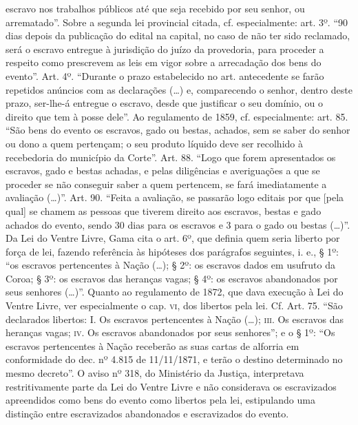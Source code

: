 {{  escravo nos trabalhos públicos até que seja recebido por seu senhor,
  ou arrematado''. Sobre a segunda lei provincial citada, cf.
  especialmente: art. 3º. ``90 dias depois da publicação do edital na
  capital, no caso de não ter sido reclamado, será o escravo entregue à
  jurisdição do juízo da provedoria, para proceder a respeito como
  prescrevem as leis em vigor sobre a arrecadação dos bens do evento''.
  Art. 4º. ``Durante o prazo estabelecido no art. antecedente se farão
  repetidos anúncios com as declarações (\ldots{}) e, comparecendo o senhor,
  dentro deste prazo, ser-lhe-á entregue o escravo, desde que justificar
  o seu domínio, ou o direito que tem à posse dele''. Ao regulamento de
  1859, cf. especialmente: art. 85. ``São bens do evento os escravos,
  gado ou bestas, achados, sem se saber do senhor ou dono a quem
  pertençam; o seu produto líquido deve ser recolhido à recebedoria do
  município da Corte''. Art. 88. ``Logo que forem apresentados os escravos,
  gado e bestas achadas, e pelas diligências e averiguações a que se
  proceder se não conseguir saber a quem pertencem, se fará
  imediatamente a avaliação (\ldots{})''. Art. 90. ``Feita a avaliação, se
  passarão logo editais por que {[}pela qual{]} se chamem as pessoas que
  tiverem direito aos escravos, bestas e gado achados do evento, sendo
  30 dias para os escravos e 3 para o gado ou bestas (\ldots{})''. Da Lei do
  Ventre Livre, Gama cita o art. 6º, que definia quem seria liberto por
  força de lei, fazendo referência às hipóteses dos parágrafos
  seguintes, i. e., § 1º: ``os escravos pertencentes à Nação (\ldots{}); §
  2º: os escravos dados em usufruto da Coroa; § 3º: os escravos das
  heranças vagas; § 4º: os escravos abandonados por seus senhores
  (\ldots{})''. Quanto ao regulamento de 1872, que dava execução à Lei do
  Ventre Livre, ver especialmente o cap. \textsc{vi}, dos libertos pela lei. Cf.
  Art. 75. ``São declarados libertos: I. Os escravos pertencentes à Nação
  (\ldots{}); \textsc{iii}. Os escravos das heranças vagas; \textsc{iv}. Os escravos
  abandonados por seus senhores''; e o § 1º: ``Os escravos pertencentes à
  Nação receberão as suas cartas de alforria em conformidade do dec. nº
  4.815 de 11/11/1871, e terão o destino determinado no mesmo decreto''.
  O aviso nº 318, do Ministério da Justiça, interpretava restritivamente
  parte da Lei do Ventre Livre e não considerava os escravizados
  apreendidos como bens do evento como libertos pela lei, estipulando
  uma distinção entre escravizados abandonados e escravizados do evento.
}}
